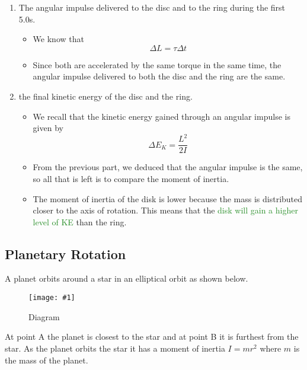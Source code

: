 \documentclass[a4paper,12pt]{article}
\newcommand{\img}[4]{\begin{center}
  \begin{figure}[H]
    \centering
    \texttt{[image: \#1]}
    \caption{#3}
    \label{fig:#4}
  \end{figure}
\end{center}}
\begin{document}
\begin{enumerate}[label=(\alph*)]
  \item The angular impulse delivered to the disc and to the ring during the first 5.0s.
        \begin{itemize}
          \item We know that $$\Delta L = \tau\Delta t$$
          \item Since both are accelerated by the same torque in the same time, the angular impulse delivered to both the disc and the ring are the same.
        \end{itemize}
  \item the final kinetic energy of the disc and the ring.
        \begin{itemize}
          \item We recall that the kinetic energy gained through an angular impulse is given by $$\Delta E_K = \frac{L^2}{2I}$$
          \item From the previous part, we deduced that the angular impulse is the same, so all that is left is to compare the moment of inertia.
          \item The moment of inertia of the disk is lower because the mass is distributed closer to the axis of rotation. This means that the \textcolor{ForestGreen}{disk will gain a higher level of KE} than the ring.
        \end{itemize}
\end{enumerate}

\pagebreak

\subsection{Planetary Rotation}

A planet orbits around a star in an elliptical orbit as shown below.
\img{ex/2.png}{0.6}{Diagram}{planetary}

At point A the planet is closest to the star and at point B it is furthest from the star. As the planet orbits the star it has a moment of inertia $I = mr^2$ where $m$ is the mass of the planet.
\end{document}

